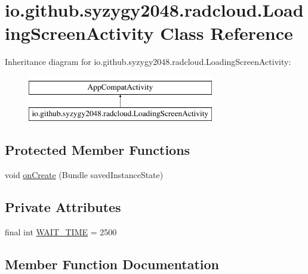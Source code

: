 \hypertarget{classio_1_1github_1_1syzygy2048_1_1radcloud_1_1_loading_screen_activity}{}\section{io.\+github.\+syzygy2048.\+radcloud.\+Loading\+Screen\+Activity Class Reference}
\label{classio_1_1github_1_1syzygy2048_1_1radcloud_1_1_loading_screen_activity}
Inheritance diagram for io.\+github.\+syzygy2048.\+radcloud.\+Loading\+Screen\+Activity\+:\begin{figure}[H]
\begin{center}
\leavevmode
\includegraphics[height=2.000000cm]{classio_1_1github_1_1syzygy2048_1_1radcloud_1_1_loading_screen_activity}
\end{center}
\end{figure}
\subsection*{Protected Member Functions}
\begin{DoxyCompactItemize}
\item 
void \mbox{\hyperlink{classio_1_1github_1_1syzygy2048_1_1radcloud_1_1_loading_screen_activity_a54bc9c6e108e50ba62aff7cc64e812b5}{on\+Create}} (Bundle saved\+Instance\+State)
\end{DoxyCompactItemize}
\subsection*{Private Attributes}
\begin{DoxyCompactItemize}
\item 
final int \mbox{\hyperlink{classio_1_1github_1_1syzygy2048_1_1radcloud_1_1_loading_screen_activity_a8dc1db6478b13139cebca00f957738fd}{W\+A\+I\+T\+\_\+\+T\+I\+ME}} = 2500
\end{DoxyCompactItemize}


\subsection{Member Function Documentation}
\mbox{\label{classio_1_1github_1_1syzygy2048_1_1radcloud_1_1_loading_screen_activity_a54bc9c6e108e50ba62aff7cc64e812b5}} 
